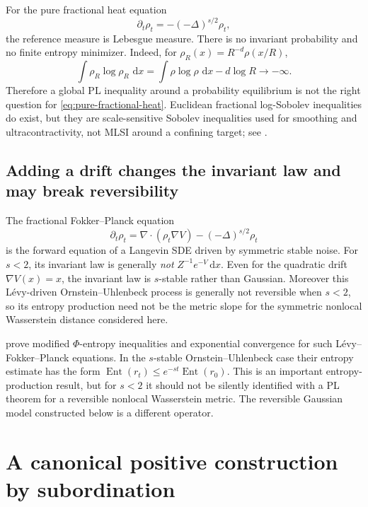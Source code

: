 \documentclass[11pt]{article}
\theoremstyle{definition}
\DeclareMathOperator{\Ent}{Ent}
\newcommand{\dd}{\,\mathrm d}
\begin{document}
For the pure fractional heat equation
\begin{equation}\label{eq:pure-fractional-heat}
  \partial_t\rho_t=-(-\Delta)^{s/2}\rho_t,
\end{equation}
the reference measure is Lebesgue measure.  There is no invariant probability
and no finite entropy minimizer.  Indeed, for
$\rho_R(x)=R^{-d}\rho(x/R)$,
\[
  \int\rho_R\log\rho_R\,\dd x
  =\int\rho\log\rho\,\dd x-d\log R\longrightarrow-\infty.
\]
Therefore a global PL inequality around a probability equilibrium is not the
right question for \eqref{eq:pure-fractional-heat}.  Euclidean fractional
log-Sobolev inequalities do exist, but they are scale-sensitive Sobolev
inequalities used for smoothing and ultracontractivity, not MLSI around a
confining target; see \citet{GentilImbert2009,Gressman2014FractionalLSI}.

\subsection{Adding a drift changes the invariant law and may break reversibility}

The fractional Fokker--Planck equation
\begin{equation}\label{eq:stable-langevin}
  \partial_t\rho_t
  =\nabla\cdot(\rho_t\nabla V)-(-\Delta)^{s/2}\rho_t
\end{equation}
is the forward equation of a Langevin SDE driven by symmetric stable noise.
For $s<2$, its invariant law is generally \emph{not}
$Z^{-1}e^{-V}\dd x$.  Even for the quadratic drift $\nabla V(x)=x$, the
invariant law is $s$-stable rather than Gaussian.  Moreover this L\'evy-driven
Ornstein--Uhlenbeck process is generally not reversible when $s<2$, so its
entropy production need not be the metric slope for the symmetric nonlocal
Wasserstein distance considered here.

\citet{GentilImbert2009} prove modified $\Phi$-entropy inequalities and
exponential convergence for such L\'evy--Fokker--Planck equations.  In the
$s$-stable Ornstein--Uhlenbeck case their entropy estimate has the form
$\Ent(r_t)\leq e^{-st}\Ent(r_0)$.  This is an important entropy-production
result, but for $s<2$ it should not be silently identified with a PL theorem
for a reversible nonlocal Wasserstein metric.  The reversible Gaussian model
constructed below is a different operator.

\section{A canonical positive construction by subordination}
\end{document}
